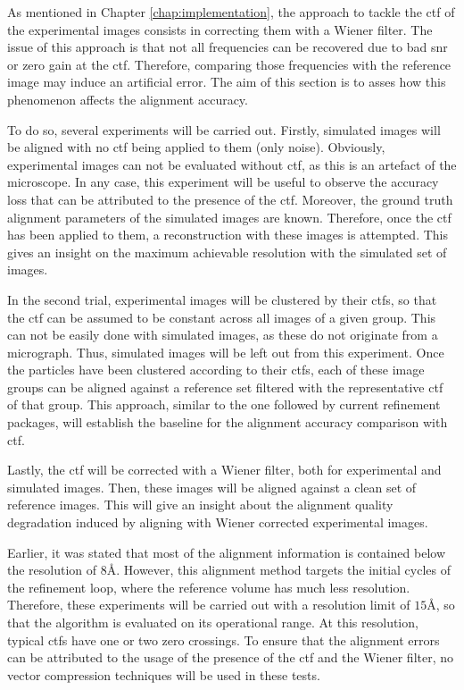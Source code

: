 \documentclass[../main.tex]{subfiles}
\begin{document}
As mentioned in Chapter \ref{chap:implementation}, the approach to tackle the \gls{ctf} of the experimental images consists in correcting them with a Wiener filter. The issue of this approach is that not all frequencies can be recovered due to bad \gls{snr} or zero gain at the \gls{ctf}. Therefore, comparing those frequencies with the reference image may induce an artificial error. The aim of this section is to asses how this phenomenon affects the alignment accuracy.

To do so, several experiments will be carried out. Firstly, simulated images will be aligned with no \gls{ctf} being applied to them (only noise). Obviously, experimental images can not be evaluated without \gls{ctf}, as this is an artefact of the microscope. In any case, this experiment will be useful to observe the accuracy loss that can be attributed to the presence of the \gls{ctf}. Moreover, the ground truth alignment parameters of the simulated images are known. Therefore, once the \gls{ctf} has been applied to them, a reconstruction with these images is attempted. This gives an insight on the maximum achievable resolution with the simulated set of images. 

In the second trial, experimental images will be clustered by their \glspl{ctf}, so that the \gls{ctf} can be assumed to be constant across all images of a given group. This can not be easily done with simulated images, as these do not originate from a micrograph. Thus, simulated images will be left out from this experiment. Once the particles have been clustered according to their \glspl{ctf}, each of these image groups can be aligned against a reference set filtered with the representative \gls{ctf} of that group. This approach, similar to the one followed by current refinement packages, will establish the baseline for the alignment accuracy comparison with \gls{ctf}. 

Lastly, the \gls{ctf} will be corrected with a Wiener filter, both for experimental and simulated images. Then, these images will be aligned against a clean set of reference images. This will give an insight about the alignment quality degradation induced by aligning with Wiener corrected experimental images. 

Earlier, it was stated that most of the alignment information is contained below the resolution of $8\si{\angstrom}$. However, this alignment method targets the initial cycles of the refinement loop, where the reference volume has much less resolution. Therefore, these experiments will be carried out with a resolution limit of $15\si{\angstrom}$, so that the algorithm is evaluated on its operational range. At this resolution, typical \glspl{ctf} have one or two zero crossings. To ensure that the alignment errors can be attributed to the usage of the presence of the \gls{ctf} and the Wiener filter, no vector compression techniques will be used in these tests.
\end{document}
